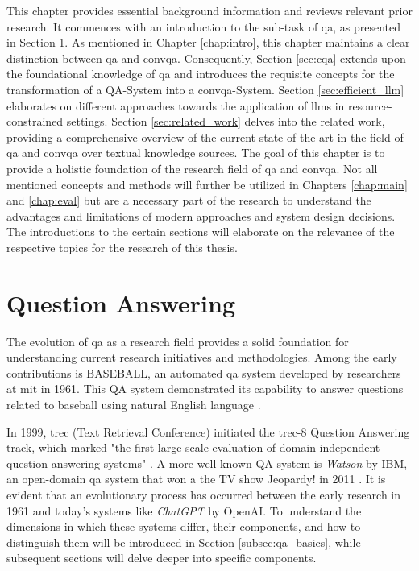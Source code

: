 This chapter provides essential background information and reviews relevant prior research. It commences with an introduction to the sub-task of \gls{qa}, as presented in Section \ref*{sec:qa}. As mentioned in Chapter \ref{chap:intro}, this chapter maintains a clear distinction between \gls{qa} and \gls{convqa}. Consequently, Section \ref{sec:cqa} extends upon the foundational knowledge of \gls*{qa} and introduces the requisite concepts for the transformation of a QA-System into a \gls{convqa}-System. Section \ref{sec:efficient_llm} elaborates on different approaches towards the application of \gls{llm}s in resource-constrained settings. Section \ref{sec:related_work} delves into the related work, providing a comprehensive overview of the current state-of-the-art in the field of \gls{qa} and \gls{convqa} over textual knowledge sources. The goal of this chapter is to provide a holistic foundation of the research field of \gls{qa} and \gls{convqa}. Not all mentioned concepts and methods will further be utilized in Chapters \ref{chap:main} and \ref{chap:eval} but are a necessary part of the research to understand the advantages and limitations of modern approaches and system design decisions. The introductions to the certain sections will elaborate on the relevance of the respective topics for the research of this thesis.

\section{Question Answering}
\label{sec:qa}

The evolution of \gls{qa} as a research field provides a solid foundation for understanding current research initiatives and methodologies. Among the early contributions is BASEBALL, an automated \gls{qa} system developed by researchers at \gls{mit} in 1961. This QA system demonstrated its capability to answer questions related to baseball using natural English language \cite{green_baseball_1961}.


In 1999, \gls{trec} (Text Retrieval Conference) initiated the \gls{trec}-8 Question Answering track, which marked "the first large-scale evaluation of domain-independent question-answering systems" \cite{voorhees_trec-8_1999}. A more well-known QA system is \textit{Watson} by IBM, an open-domain \gls{qa} system that won a the TV show Jeopardy! in 2011 \cite{ferrucci_introduction_2012}. It is evident that an evolutionary process has occurred between the early research in 1961 and today's systems like \textit{ChatGPT} by OpenAI. To understand the dimensions in which these systems differ, their components, and how to distinguish them will be introduced in Section \ref{subsec:qa_basics}, while subsequent sections will delve deeper into specific components.

